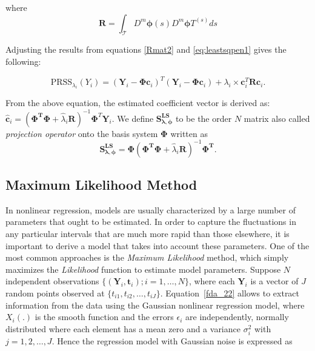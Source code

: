 where  
\begin{equation}\label{Rmat2}
\mathbf{R}=\int_{\mathcal{T}} D^{m}\bm{\phi}(s)D^{m}\bm{\phi}T^(s)ds
\end{equation}

Adjusting the results from equations \eqref{Rmat2} and \eqref{eq:leastsqpen1} gives the following:

\begin{equation}\label{penalized_LS}
\text{PRSS}_{\lambda_i}(Y_i) =\left(\mathbf{Y}_i-\mathbf{\Phi}\mathbf{c}_i\right)^T\left(\mathbf{Y}_i-\mathbf{\Phi}\mathbf{c}_i\right)+\lambda_i \times \mathbf{c}_i^T\mathbf{R}\mathbf{c}_i.
\end{equation}

From the above equation, the estimated coefficient vector is derived as:\\ $\bm{\hat{c}}_i=\left(\bm{\Phi^T \Phi} + \hat{\lambda}_i \bm{R}\right)^{-1}\bm{\Phi}^T \bm{Y}_i$. We define $\mathbf{S_{\lambda,\phi}^{LS}}$ to be the order $N$ matrix also called \textit{projection operator} onto the basis system $\mathbf{\Phi}$ written as
\begin{equation}\label{project_op1}
\mathbf{S_{\lambda,\phi}^{LS}} = \bm{\Phi}\left(\bm{\Phi^T \Phi} + \hat{\lambda}_i \mathbf{R}\right)^{-1}\bm{\Phi^T}.
\end{equation}

\subsection{Maximum Likelihood Method}\label{ML_method}
In nonlinear regression, models are usually characterized by a large number of parameters that ought to be estimated. In order to capture the fluctuations in any particular intervals that are much more rapid than those elsewhere, it is important to derive a model that takes into account these parameters. One of the most common approaches is the \textit{Maximum Likelihood} method, which simply maximizes the \textit{Likelihood} function to estimate model parameters.
Suppose $N$ independent observations $\{(\bm{Y}_{i},\mathbf{t}_{i}); i = 1,\dots,N\}$, where each $\bm{Y}_i$ is a vector of $J$ random points observed at $\{t_{i1},t_{i2},\dots,t_{iJ}\}$. Equation~\eqref{fda_22} allows to extract information from the data using the Gaussian nonlinear regression model, where $X_i(.)$ is the smooth function and the errors $\epsilon_i$ are independently, normally distributed where each element has a mean zero and a variance $\sigma^2_{i}$ with $j = 1,2,\dots,J$. Hence the regression model with Gaussian noise is expressed as

